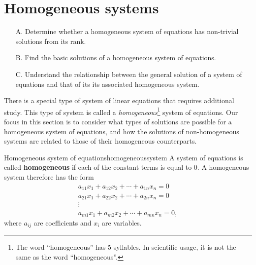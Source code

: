 \section{Homogeneous systems}
\label{sec:homogeneous-systems}

\begin{outcome}
  \begin{enumerate}
  \item[A.] Determine whether a homogeneous system of equations has
    non-trivial solutions from its rank.
    
  \item[B.] Find the basic solutions of a homogeneous system of
    equations.
    
  \item[C.] Understand the relationship between the general solution of
    a system of equations and that of its its associated homogeneous
    system.
  \end{enumerate}
\end{outcome}

There is a special type of system of linear equations that requires
additional study. This type of system is called a {\em
  homogeneous}\footnote{The word ``homogeneous'' has 5 syllables. In
  scientific usage, it is not the same as the word ``homogeneous''.}
system of equations.  Our focus in this section is to consider what
types of solutions are possible for a homogeneous system of equations,
and how the solutions of non-homogeneous systems are related to those
of their homogeneous counterparts.

\begin{definition}{Homogeneous system of equations}{homogeneoussystem}
  A system of equations is called
  \textbf{homogeneous}
  if each of the constant terms is equal to $0$. A homogeneous system
  therefore has the form
\begin{equation*}
\begin{array}{c}
a_{11}x_{1}+a_{12}x_{2}+\cdots +a_{1n}x_{n}= 0 \\
a_{21}x_{1}+a_{22}x_{2}+\cdots +a_{2n}x_{n}= 0  \\
\vdots \\
a_{m1}x_{1}+a_{m2}x_{2}+\cdots +a_{mn}x_{n}= 0, 
\end{array}
\end{equation*}
where $a_{ij}$ are coefficients and $x_{i}$ are variables.
\end{definition}

